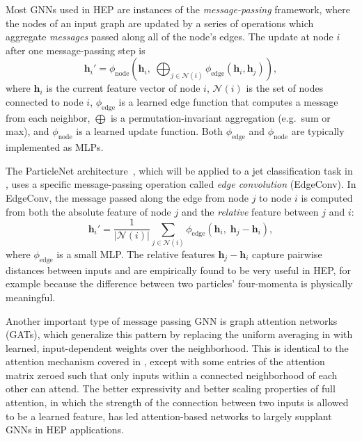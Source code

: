 Most GNNs used in HEP are instances of the \textit{message-passing} framework, where the nodes of an input graph are updated by a series of operations which aggregate \textit{messages} passed along all of the node's edges.
The update at node $i$ after one message-passing step is
\begin{equation}
    \mathbf{h}_i' = \phi_{\text{node}}\!\left( \mathbf{h}_i,\; \bigoplus_{j \in \mathcal{N}(i)} \phi_{\text{edge}}(\mathbf{h}_i, \mathbf{h}_j) \right),
    \label{eqn:message_passing}
\end{equation}
where $\mathbf{h}_i$ is the current feature vector of node $i$, $\mathcal{N}(i)$ is the set of nodes connected to node $i$, $\phi_{\text{edge}}$ is a learned edge function that computes a message from each neighbor, $\bigoplus$ is a permutation-invariant aggregation (e.g.\ sum or max), and $\phi_{\text{node}}$ is a learned update function.
Both $\phi_{\text{edge}}$ and $\phi_{\text{node}}$ are typically implemented as MLPs.

The ParticleNet architecture~\cite{Qu:2019gqs}, which will be applied to a jet classification task in , uses a specific message-passing operation called \textit{edge convolution} (EdgeConv).
In EdgeConv, the message passed along the edge from node $j$ to node $i$ is computed from both the absolute feature of node $j$ and the \textit{relative} feature between $j$ and $i$:
\begin{equation}
    \mathbf{h}_i' = \frac{1}{|\mathcal{N}(i)|} \sum_{j \in \mathcal{N}(i)} \phi_{\text{edge}}\!\left( \mathbf{h}_i,\; \mathbf{h}_j - \mathbf{h}_i \right),
    \label{eqn:edgeconv}
\end{equation}
where $\phi_{\text{edge}}$ is a small MLP.
The relative features $\mathbf{h}_j - \mathbf{h}_i$ capture pairwise distances between inputs and are empirically found to be very useful in HEP, for example because the difference between two particles' four-momenta is physically meaningful.

Another important type of message passing GNN is graph attention networks (GATs), which generalize this pattern by replacing the uniform averaging in  with learned, input-dependent weights over the neighborhood.
This is identical to the attention mechanism covered in , except with some entries of the attention matrix zeroed such that only inputs within a connected neighborhood of each other can attend.
The better expressivity and better scaling properties of full attention, in which the strength of the connection between two inputs is allowed to be a learned feature, has led attention-based networks to largely supplant GNNs in HEP applications.

